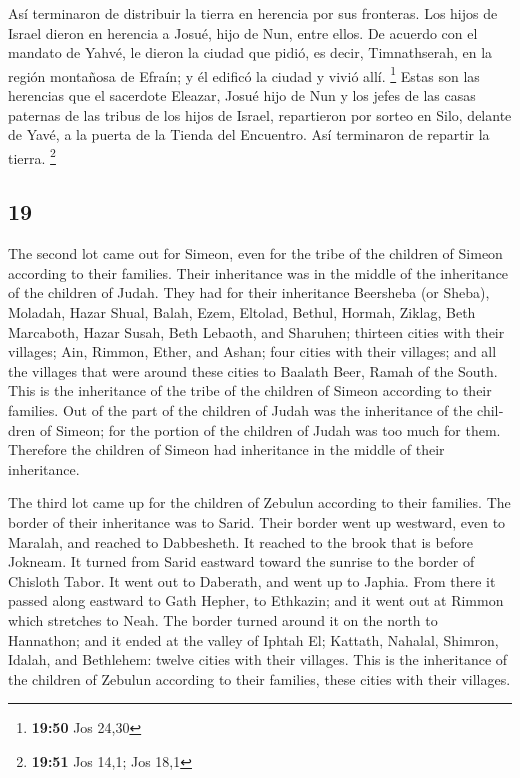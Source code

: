 \begin{paracol}{2}
 Así terminaron de distribuir la tierra en herencia por
sus fronteras. Los hijos de Israel dieron en herencia a Josué, hijo de
Nun, entre ellos.  De acuerdo con el mandato de Yahvé, le
dieron la ciudad que pidió, es decir, Timnathserah, en la región
montañosa de Efraín; y él edificó la ciudad y vivió allí. \footnote{\textbf{19:50}
  Jos 24,30}  Estas son las herencias que el sacerdote
Eleazar, Josué hijo de Nun y los jefes de las casas paternas de las
tribus de los hijos de Israel, repartieron por sorteo en Silo, delante
de Yavé, a la puerta de la Tienda del Encuentro. Así terminaron de
repartir la tierra. \footnote{\textbf{19:51} Jos 14,1; Jos 18,1}

\switchcolumn
\begin{otherlanguage}{english}

\hypertarget{section-37}{%
\section{19}\label{section-37}}

 The second lot came out for Simeon, even for the tribe of
the children of Simeon according to their families. Their inheritance
was in the middle of the inheritance of the children of Judah.
 They had for their inheritance Beersheba (or Sheba),
Moladah,  Hazar Shual, Balah, Ezem, 
Eltolad, Bethul, Hormah,  Ziklag, Beth Marcaboth, Hazar
Susah,  Beth Lebaoth, and Sharuhen; thirteen cities with
their villages;  Ain, Rimmon, Ether, and Ashan; four
cities with their villages;  and all the villages that
were around these cities to Baalath Beer, Ramah of the South. This is
the inheritance of the tribe of the children of Simeon according to
their families.  Out of the part of the children of Judah
was the inheritance of the children of Simeon; for the portion of the
children of Judah was too much for them. Therefore the children of
Simeon had inheritance in the middle of their inheritance.

 The third lot came up for the children of Zebulun
according to their families. The border of their inheritance was to
Sarid.  Their border went up westward, even to Maralah,
and reached to Dabbesheth. It reached to the brook that is before
Jokneam.  It turned from Sarid eastward toward the
sunrise to the border of Chisloth Tabor. It went out to Daberath, and
went up to Japhia.  From there it passed along eastward
to Gath Hepher, to Ethkazin; and it went out at Rimmon which stretches
to Neah.  The border turned around it on the north to
Hannathon; and it ended at the valley of Iphtah El; 
Kattath, Nahalal, Shimron, Idalah, and Bethlehem: twelve cities with
their villages.  This is the inheritance of the children
of Zebulun according to their families, these cities with their
villages.


\end{otherlanguage}
\end{paracol}
